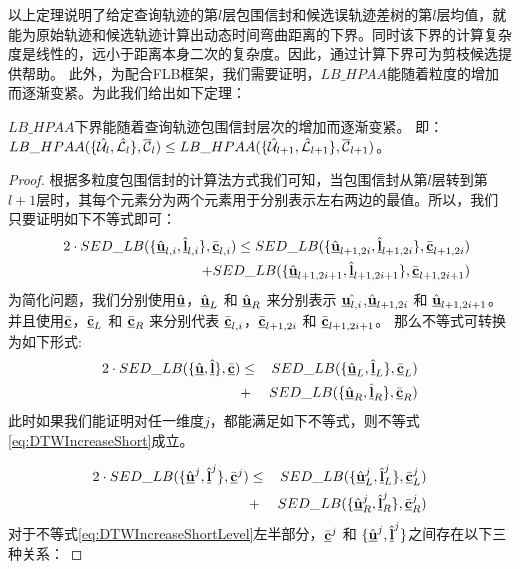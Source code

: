 以上定理说明了给定查询轨迹的第$l$层包围信封和候选误轨迹差树的第$l$层均值，就能为原始轨迹和候选轨迹计算出动态时间弯曲距离的下界。同时该下界的计算复杂度是线性的，远小于距离本身二次的复杂度。因此，通过计算下界可为剪枝候选提供帮助。
此外，为配合FLB框架，我们需要证明，$LB\_HPAA$能随着粒度的增加而逐渐变紧。为此我们给出如下定理：
\begin{theorem}\label{theo:DTWLbInc}
	$LB\_HPAA$下界能随着查询轨迹包围信封层次的增加而逐渐变紧。
	 即： $LB\_HPAA({  \{\hat{{\cal U}_{l}}, \hat{{\cal L}_{l}}\},\overline{{\cal C}}_{l}})\le  LB\_HPAA({  \{\hat{{\cal U}}_{l+1}, \hat{\cal L}_{l+1}\},\overline{\cal C}_{l+1}})$。
\end{theorem}

\begin{proof}
	根据多粒度包围信封的计算法方式我们可知，当包围信封从第$l$层转到第$l+1$层时，其每个元素分为两个元素用于分别表示左右两边的最值。所以，我们只要证明如下不等式即可：
	\begin{eqnarray}\label{eq:increa}
	&&	2\cdot SED\_LB(\{ \hat{\emph{{\textbf{u}}}}_{l,i}, \hat{\emph{{\textbf{l}}}}_{l,i} \}, \bar{\emph{{\textbf{c}}}}_{l,i}) \le SED\_LB(\{ \hat{\emph{{\textbf{u}}}}_{l+1,2i}, \hat{\emph{{\textbf{l}}}}_{l+1,2i} \}, \bar{\emph{{\textbf{c}}}}_{l+1,2i}) \nonumber \\
	&&\qquad \qquad \qquad \qquad+ SED\_LB(\{ \hat{\emph{{\textbf{u}}}}_{l+1,2i+1}, \hat{\emph{{\textbf{l}}}}_{l+1,2i+1} \}, \bar{\emph{{\textbf{c}}}}_{l+1,2i+1})
	\end{eqnarray}
	为简化问题，我们分别使用$\hat{\emph{{\textbf{u}}}}$，$\hat{\emph{{\textbf{u}}}}_{L} $ 和 $\hat{\emph{{\textbf{u}}}}_{R}$ 来分别表示 $\hat{\emph{{\textbf{u}}}_{l,i}}$,$\hat{\emph{{\textbf{u}}}}_{l+1,2i}$ 和 $\hat{\emph{{\textbf{u}}}}_{l+1,2i+1}$。并且使用$\bar{\emph{{\textbf{c}}}}$，$\bar{\emph{{\textbf{c}}}}_{L}$ 和 $\bar{\emph{{\textbf{c}}}}_{R}$ 来分别代表	$\bar{\emph{{\textbf{c}}}}_{l,i}$，$\bar{\emph{{\textbf{c}}}}_{l+1,2i}$ 和 $\bar{\emph{{\textbf{c}}}}_{l+1,2i+1}$。
	那么不等式可转换为如下形式:
	\begin{eqnarray}\label{eq:DTWIncreaseShort}
	2\cdot SED\_LB(\{ \hat{\emph{{\textbf{u}}}}, \hat{\emph{{\textbf{l}}}} \}, \bar{\emph{{\textbf{c}}}}) &\le& SED\_LB(\{ \hat{\emph{{\textbf{u}}}}_{L}, \hat{\emph{{\textbf{l}}}}_{L} \}, \bar{\emph{{\textbf{c}}}}_{L})  \nonumber \\ &+& SED\_LB(\{ \hat{\emph{{\textbf{u}}}}_{R}, \hat{\emph{{\textbf{l}}}}_{R} \}, \bar{\emph{{\textbf{c}}}}_{R})
	\end{eqnarray}
	此时如果我们能证明对任一维度$j$，都能满足如下不等式，则不等式\ref{eq:DTWIncreaseShort}成立。
	
	\allowdisplaybreaks
	\begin{eqnarray}\label{eq:DTWIncreaseShortLevel}
	2\cdot SED\_LB(\{ \hat{\emph{{\textbf{u}}}}^{j}, \hat{\emph{{\textbf{l}}}}^{j} \}, \bar{\emph{{\textbf{c}}}}^{j}) &\le& SED\_LB(\{ \hat{\emph{{\textbf{u}}}}_{L}^{j}, \hat{\emph{{\textbf{l}}}}_{L}^{j} \}, \bar{\emph{{\textbf{c}}}}_{L}^{j} )  \nonumber \\ &+& SED\_LB(\{ \hat{\emph{{\textbf{u}}}}_{R}^{j}, \hat{\emph{{\textbf{l}}}}_{R}^{j}  \}, \bar{\emph{{\textbf{c}}}}_{R}^{j})
	\end{eqnarray}
		\allowdisplaybreaks[4]
	对于不等式\ref{eq:DTWIncreaseShortLevel}左半部分，$\bar{\emph{{\textbf{c}}}}^{j}$ 和 $\{\hat{\emph{{\textbf{u}}}}^{j},\hat{\emph{{\textbf{l}}}}^{j}\}$之间存在以下三种关系：
	

\end{proof}
